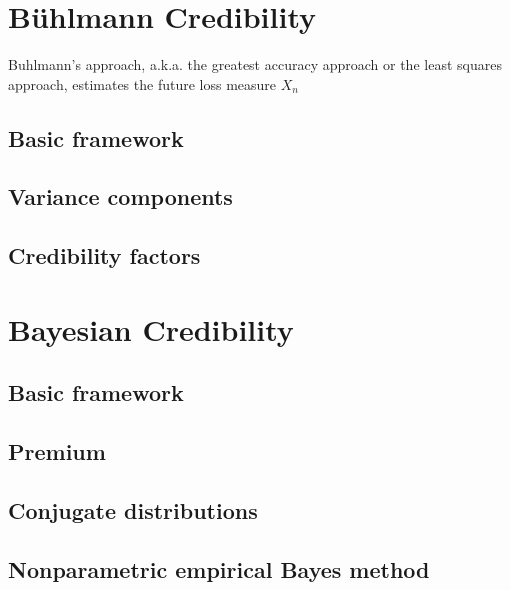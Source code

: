 \documentclass[english]{article}
\begin{document}
\begin{multicols*}{2}
\newpage
\section{Bühlmann Credibility}\label{sec:ABuhl}
\begin{rappel_enhanced}[Context]
Buhlmann's approach, a.k.a. the greatest accuracy approach or the least squares approach, estimates the future loss measure $X_{n }$
\end{rappel_enhanced}
\subsection{Basic framework}

 

\subsection{Variance components}



\subsection{Credibility factors}



\newpage
\section{Bayesian Credibility}\label{sec:ABayes}
\subsection{Basic framework}


\subsection{Premium}



\subsection{Conjugate distributions}

\subsection{Nonparametric empirical Bayes method}





\end{multicols*}
\end{document}
